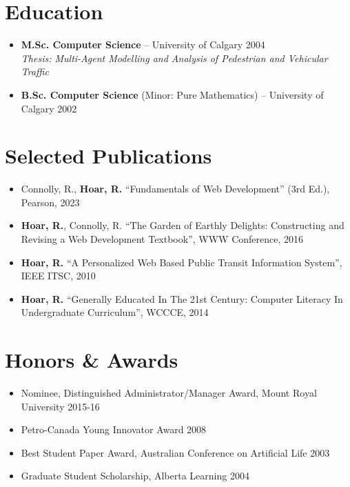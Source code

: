 \documentclass[11pt]{article}
\newcommand{\tech}[1]{\textcolor{secondary}{\textbf{#1}}}
\begin{document}
\section*{Education}
\begin{itemize}
    \item \tech{M.Sc. Computer Science} -- University of Calgary \hfill 2004 \\
    \textit{Thesis: Multi-Agent Modelling and Analysis of Pedestrian and Vehicular Traffic}
    \item \tech{B.Sc. Computer Science} (Minor: Pure Mathematics) -- University of Calgary \hfill 2002
\end{itemize}

\section*{Selected Publications}
\begin{itemize}[nosep,leftmargin=*]
    \item Connolly, R., \textbf{Hoar, R.} ``Fundamentals of Web Development'' (3rd Ed.), Pearson, 2023
    \item \textbf{Hoar, R.}, Connolly, R. ``The Garden of Earthly Delights: Constructing and Revising a Web Development Textbook'', WWW Conference, 2016
    \item \textbf{Hoar, R.} ``A Personalized Web Based Public Transit Information System'', IEEE ITSC, 2010
    \item \textbf{Hoar, R.} ``Generally Educated In The 21st Century: Computer Literacy In Undergraduate Curriculum'', WCCCE, 2014
\end{itemize}

\section*{Honors \& Awards}
\begin{itemize}[nosep,leftmargin=*]
    \item Nominee, Distinguished Administrator/Manager Award, Mount Royal University \hfill 2015-16
    \item Petro-Canada Young Innovator Award \hfill 2008
    \item Best Student Paper Award, Australian Conference on Artificial Life \hfill 2003
    \item Graduate Student Scholarship, Alberta Learning \hfill 2004
\end{itemize}
\end{document}

